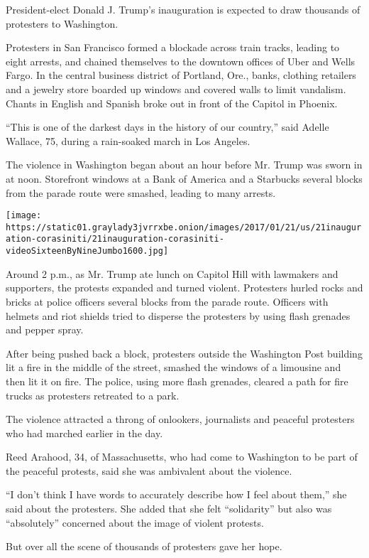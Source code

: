 President-elect Donald J. Trump's inauguration is expected to draw
thousands of protesters to Washington.

Protesters in San Francisco formed a blockade across train tracks,
leading to eight arrests, and chained themselves to the downtown offices
of Uber and Wells Fargo. In the central business district of Portland,
Ore., banks, clothing retailers and a jewelry store boarded up windows
and covered walls to limit vandalism. Chants in English and Spanish
broke out in front of the Capitol in Phoenix.

``This is one of the darkest days in the history of our country,'' said
Adelle Wallace, 75, during a rain-soaked march in Los Angeles.

The violence in Washington began about an hour before Mr. Trump was
sworn in at noon. Storefront windows at a Bank of America and a
Starbucks several blocks from the parade route were smashed, leading to
many arrests.

\texttt{[image: https://static01.graylady3jvrrxbe.onion/images/2017/01/21/us/21inauguration-corasiniti/21inauguration-corasiniti-videoSixteenByNineJumbo1600.jpg]}

Around 2 p.m., as Mr. Trump ate lunch on Capitol Hill with lawmakers and
supporters, the protests expanded and turned violent. Protesters hurled
rocks and bricks at police officers several blocks from the parade
route. Officers with helmets and riot shields tried to disperse the
protesters by using flash grenades and pepper spray.

After being pushed back a block, protesters outside the Washington Post
building lit a fire in the middle of the street, smashed the windows of
a limousine and then lit it on fire. The police, using more flash
grenades, cleared a path for fire trucks as protesters retreated to a
park.

The violence attracted a throng of onlookers, journalists and peaceful
protesters who had marched earlier in the day.

Reed Arahood, 34, of Massachusetts, who had come to Washington to be
part of the peaceful protests, said she was ambivalent about the
violence.

``I don't think I have words to accurately describe how I feel about
them,'' she said about the protesters. She added that she felt
``solidarity'' but also was ``absolutely'' concerned about the image of
violent protests.

But over all the scene of thousands of protesters gave her hope.

